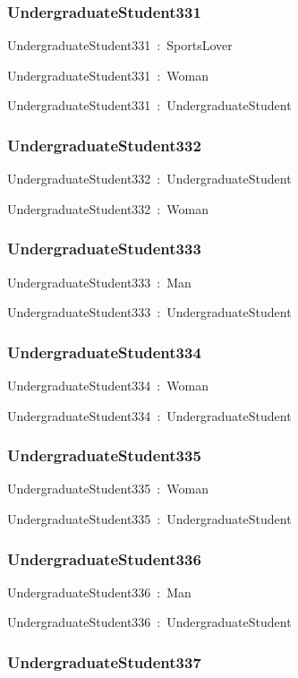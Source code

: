 \documentclass{article}
\begin{document}
\subsubsection*{UndergraduateStudent331}

UndergraduateStudent331~:~SportsLover

UndergraduateStudent331~:~Woman

UndergraduateStudent331~:~UndergraduateStudent

\subsubsection*{UndergraduateStudent332}

UndergraduateStudent332~:~UndergraduateStudent

UndergraduateStudent332~:~Woman

\subsubsection*{UndergraduateStudent333}

UndergraduateStudent333~:~Man

UndergraduateStudent333~:~UndergraduateStudent

\subsubsection*{UndergraduateStudent334}

UndergraduateStudent334~:~Woman

UndergraduateStudent334~:~UndergraduateStudent

\subsubsection*{UndergraduateStudent335}

UndergraduateStudent335~:~Woman

UndergraduateStudent335~:~UndergraduateStudent

\subsubsection*{UndergraduateStudent336}

UndergraduateStudent336~:~Man

UndergraduateStudent336~:~UndergraduateStudent

\subsubsection*{UndergraduateStudent337}
\end{document}
